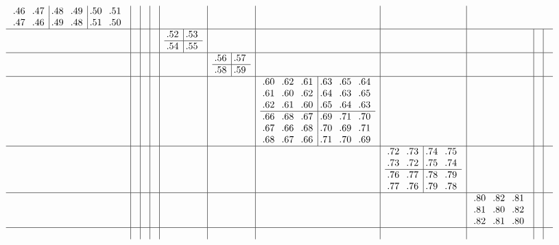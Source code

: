 \documentclass[10pt,a4paper,landscape]{amsart}
\begin{document}
\begin{align*}
\begin{array}{c|c|c|c|c|c|c|c|c|c|c}
\begin{array}{rr|rr|rr}
\llap.46&\llap.47&\llap.48&\llap.49&\llap.50&\llap.51\\%
\llap.47&\llap.46&\llap.49&\llap.48&\llap.51&\llap.50\\%
\end{array}%
&&&&&&&\\\hline
&&&&
\begin{array}{r|r}%
\llap.52&\llap.53\\\hline%
\llap.54&\llap.55\\%
\end{array}%
&&&&&&\\\hline
&&&&&
\begin{array}{r|r}%
\llap.56&\llap.57\\\hline%
\llap.58&\llap.59\\%
\end{array}%
&&&&&\\\hline
&&&&&&
\begin{array}{rrr|rrr}%
\llap.60&\llap.62&\llap.61&\llap.63&\llap.65&\llap.64\\%
\llap.61&\llap.60&\llap.62&\llap.64&\llap.63&\llap.65\\%
\llap.62&\llap.61&\llap.60&\llap.65&\llap.64&\llap.63\\\hline%
\llap.66&\llap.68&\llap.67&\llap.69&\llap.71&\llap.70\\%
\llap.67&\llap.66&\llap.68&\llap.70&\llap.69&\llap.71\\%
\llap.68&\llap.67&\llap.66&\llap.71&\llap.70&\llap.69\\%
\end{array}%
&&&&\\\hline
&&&&&&&
\begin{array}{rr|rr}%
\llap.72&\llap.73&\llap.74&\llap.75\\%
\llap.73&\llap.72&\llap.75&\llap.74\\\hline%
\llap.76&\llap.77&\llap.78&\llap.79\\%
\llap.77&\llap.76&\llap.79&\llap.78\\%
\end{array}%
&&&\\\hline
&&&&&&&&
\begin{array}{rrr}%
\llap.80&\llap.82&\llap.81\\%
\llap.81&\llap.80&\llap.82\\%
\llap.82&\llap.81&\llap.80\\%
\end{array}%
&&\\\hline
&&&&&&&&&
\begin{array}{rrr}%

\end{array}
\end{array}
\end{align*}
\end{document}
